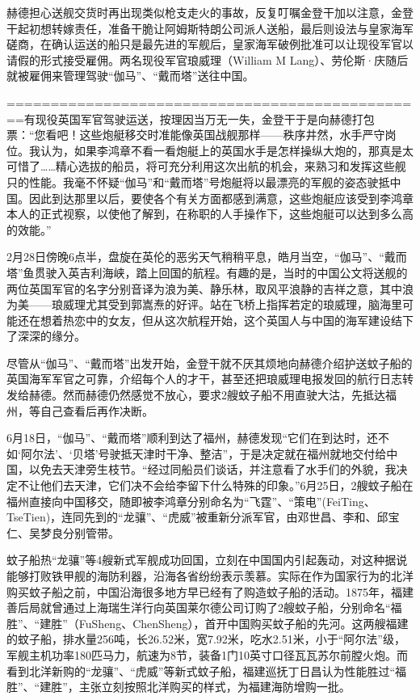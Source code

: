 \documentclass[12pt,UTF8]{ctexbook}
\begin{document}
赫德担心送舰交货时再出现类似枪支走火的事故，反复叮嘱金登干加以注意，金登干起初想转嫁责任，准备干脆让阿姆斯特朗公司派人送船，最后则设法与皇家海军磋商，在确认运送的船只是最先进的军舰后，皇家海军破例批准可以让现役军官以请假的形式接受雇佣。两名现役军官琅威理（William M Lang）、劳伦斯·庆随后就被雇佣来管理驾驶“伽马”、“戴而塔”送往中国。

================================================有现役英国军官驾驶运送，按理因当万无一失，金登干于是向赫德打包票：“您看吧！这些炮艇移交时准能像英国战舰那样——秩序井然，水手严守岗位。我认为，如果李鸿章不看一看炮艇上的英国水手是怎样操纵大炮的，那真是太可惜了……精心选拔的船员，将可充分利用这次出航的机会，来熟习和发挥这些舰只的性能。我毫不怀疑“伽马”和“戴而塔”号炮艇将以最漂亮的军舰的姿态驶抵中国。因此到达那里以后，要使各个有关方面都感到满意，这些炮艇应该受到李鸿章本人的正式视察，以使他了解到，在称职的人手操作下，这些炮艇可以达到多么高的效能。”

2月28日傍晚6点半，盘旋在英伦的恶劣天气稍稍平息，皓月当空，“伽马”、“戴而塔”鱼贯驶入英吉利海峡，踏上回国的航程。有趣的是，当时的中国公文将送舰的两位英国军官的名字分别音译为浪为美、静乐林，取风平浪静的吉祥之意，其中浪为美——琅威理尤其受到郭嵩焘的好评。站在飞桥上指挥若定的琅威理，脑海里可能还在想着热恋中的女友，但从这次航程开始，这个英国人与中国的海军建设结下了深深的缘分。

尽管从“伽马”、“戴而塔”出发开始，金登干就不厌其烦地向赫德介绍护送蚊子船的英国海军军官之可靠，介绍每个人的才干，甚至还把琅威理电报发回的航行日志转发给赫德。然而赫德仍然感觉不放心，要求2艘蚊子船不用直驶大沽，先抵达福州，等自己查看后再作决断。

6月18日，“伽马”、“戴而塔”顺利到达了福州，赫德发现“它们在到达时，还不如‘阿尔法’、‘贝塔’号驶抵天津时干净、整洁”，于是决定就在福州就地交付给中国，以免去天津旁生枝节。“经过同船员们谈话，并注意看了水手们的外貌，我决定不让他们去天津，它们决不会给李留下什么特殊的印象。”6月25日，2艘蚊子船在福州直接向中国移交，随即被李鸿章分别命名为“飞霆”、“策电”(FeiTing、TseTien)，连同先到的“龙骧”、“虎威”被重新分派军官，由邓世昌、李和、邱宝仁、吴梦良分别管带。

蚊子船热“龙骧”等4艘新式军舰成功回国，立刻在中国国内引起轰动，对这种据说能够打败铁甲舰的海防利器，沿海各省纷纷表示羡慕。实际在作为国家行为的北洋购买蚊子船之前，中国沿海很多地方早已经有了购造蚊子船的活动。1875年，福建善后局就曾通过上海瑞生洋行向英国莱尔德公司订购了2艘蚊子船，分别命名“福胜”、“建胜”（FuSheng、ChenSheng），首开中国购买蚊子船的先河。这两艘福建的蚊子船，排水量256吨，长26.52米，宽7.92米，吃水2.51米，小于“阿尔法”级，军舰主机功率180匹马力，航速为8节，装备1门10英寸口径瓦瓦苏尔前膛火炮。而看到北洋新购的“龙骧”、“虎威”等新式蚊子船，福建巡抚丁日昌认为性能胜过“福胜”、“建胜”，主张立刻按照北洋购买的样式，为福建海防增购一批。
\end{document}
